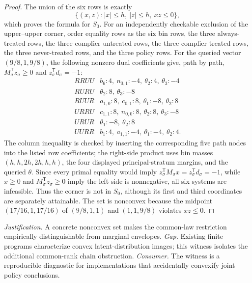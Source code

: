 \documentclass{article}
\begin{document}
\begin{proof}
The union of the six rows is exactly
\[
\{(x,z):|x|\le h,\ |z|\le h,\ xz\le0\},
\]
which proves the formula for \(S_0\).  For an independently checkable exclusion of the upper--upper corner, order equality rows as the six bin rows, the three always-treated rows, the three complier untreated rows, the three complier treated rows, the three never-treated rows, and the three policy rows.  For the queried vector \((9/8,1,9/8)\), the following nonzero dual coefficients give, path by path, \(M_\sigma^{\mathsf T}z_\sigma\ge0\) and \(z_\sigma^{\mathsf T}d_\sigma=-1\):
\[
\begin{array}{c|l}
RRUU&b_6:4,\ n_{0,1}:-4,\ \theta_2:4,\ \theta_3:-4\\
RURU&\theta_2:8,\ \theta_3:-8\\
RUUR&a_{1,0}:8,\ c_{0,1}:8,\ \theta_1:-8,\ \theta_2:8\\
URRU&c_{1,1}:8,\ n_{0,0}:8,\ \theta_2:8,\ \theta_3:-8\\
URUR&\theta_1:-8,\ \theta_2:8\\
UURR&b_1:4,\ a_{1,1}:-4,\ \theta_1:-4,\ \theta_2:4.
\end{array}
\]
The column inequality is checked by inserting the corresponding five path nodes into the listed row coefficients; the right-side product uses bin masses \((h,h,2h,2h,h,h)\), the four displayed principal-stratum margins, and the queried \(\theta\).  Since every primal equality would imply \(z_\sigma^{\mathsf T}M_\sigma x=z_\sigma^{\mathsf T}d_\sigma=-1\), while \(x\ge0\) and \(M_\sigma^{\mathsf T}z_\sigma\ge0\) imply the left side is nonnegative, all six systems are infeasible.  Thus the corner is not in \(S_0\), although its first and third coordinates are separately attainable.  The set is nonconvex because the midpoint \((17/16,1,17/16)\) of \((9/8,1,1)\) and \((1,1,9/8)\) violates \(xz\le0\).
\end{proof}
\par\smallskip\noindent \textit{Justification.} A concrete nonconvex set makes the common-law restriction empirically distinguishable from marginal envelopes. \textit{Gap.} Existing finite programs characterize convex latent-distribution images; this witness isolates the additional common-rank chain obstruction. \textit{Consumer.} The witness is a reproducible diagnostic for implementations that accidentally convexify joint policy conclusions.
\end{document}
